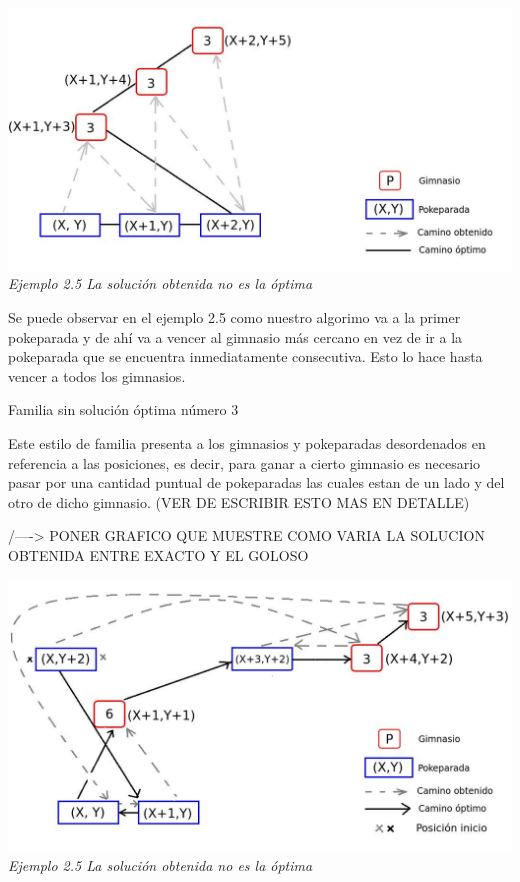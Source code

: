 \vspace*{0.3cm} \vspace*{0.3cm}
  \begin{center}
\includegraphics[scale=0.60]{./EJ2/nooptima.jpeg}
\\{\textit{Ejemplo 2.5 La soluci\'on obtenida no es la \'optima}}
  \end{center}
  \vspace*{0.3cm}

Se puede observar en el ejemplo 2.5 como nuestro algorimo va a la primer pokeparada y de ah\'i va a vencer al gimnasio m\'as cercano en vez de ir a la pokeparada que se encuentra inmediatamente consecutiva. Esto lo hace hasta vencer a todos los gimnasios.

\begin{center}
Familia sin soluci\'on \'optima n\'umero 3
\end{center}

Este estilo de familia presenta a los gimnasios y pokeparadas desordenados en referencia a las posiciones, es decir, para ganar a cierto gimnasio es necesario pasar por una cantidad puntual de pokeparadas las cuales estan de un lado y del otro de dicho gimnasio.
(VER DE ESCRIBIR ESTO MAS EN DETALLE)

/----> PONER GRAFICO QUE MUESTRE COMO VARIA LA SOLUCION OBTENIDA ENTRE EXACTO Y EL GOLOSO 



\vspace*{0.3cm} \vspace*{0.3cm}
  \begin{center}
\includegraphics[scale=0.60]{./EJ2/nooptima2.jpeg}
\\{\textit{Ejemplo 2.5 La soluci\'on obtenida no es la \'optima}}
  \end{center}
  \vspace*{0.3cm}
  
